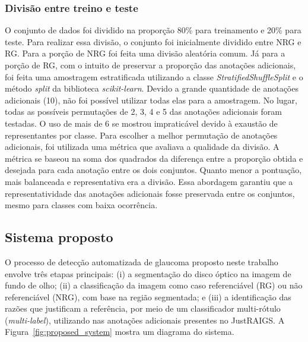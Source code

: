 \documentclass[12pt]{article}
\begin{document}
\subsubsection{Divisão entre treino e teste}
\label{sec:dataset:split}

O conjunto de dados foi dividido na proporção 80\% para treinamento e 20\% para teste. Para realizar essa divisão, o conjunto foi inicialmente dividido entre NRG e RG. Para a porção de NRG foi feita uma divisão aleatória comum. Já para a porção de RG, com o intuito de preservar a proporção das anotações adicionais, foi feita uma amostragem estratificada utilizando a classe \emph{StratifiedShuffleSplit} e o método \emph{split} da biblioteca \emph{scikit-learn}. Devido a grande quantidade de anotações adicionais (10), não foi possível utilizar todas elas para a amostragem. No lugar, todas as possíveis permutações de 2, 3, 4 e 5 das anotações adicionais foram testadas. O uso de mais de 6 se mostrou impraticável devido à exaustão de representantes por classe. Para escolher a melhor permutação de anotações adicionais, foi utilizada uma métrica que avaliava a qualidade da divisão. A métrica se baseou na soma dos quadrados da diferença entre a proporção obtida e desejada para cada anotação entre os dois conjuntos. Quanto menor a pontuação, mais balanceada e representativa era a divisão. Essa abordagem garantiu que a representatividade das anotações adicionais fosse preservada entre os conjuntos, mesmo para classes com baixa ocorrência.

\subsection{Sistema proposto}
\label{sec:pipeline}

O processo de detecção automatizada de glaucoma proposto neste trabalho envolve três etapas principais: (i) a segmentação do disco óptico na imagem de fundo de olho; (ii) a classificação da imagem como caso referenciável (RG) ou não referenciável (NRG), com base na região segmentada; e (iii) a identificação das razões que justificam a referência, por meio de um classificador multi-rótulo (\emph{multi-label}), utilizando nas anotações adicionais presentes no JustRAIGS. A Figura~\ref{fig:proposed_system} mostra um diagrama do sistema.
\end{document}
